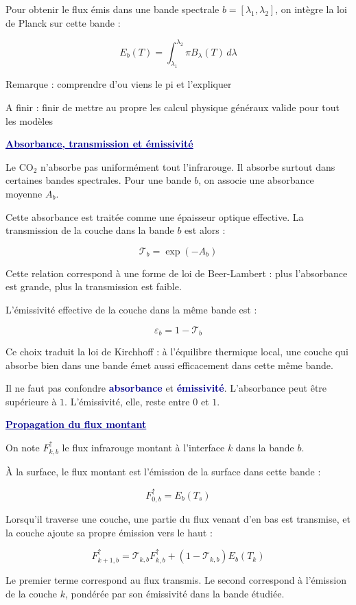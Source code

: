 \documentclass[11pt,a4paper]{article}
\newcommand{\COtwo}{CO$_2$}
\newcommand{\motcle}[1]{\textcolor{DarkBlue}{\textbf{#1}}}
\newcommand{\bloc}[1]{\vspace{0.9em}\noindent\textcolor{DarkBlue}{\underline{\textbf{#1}}}\par\vspace{0.35em}}
\begin{document}
Pour obtenir le flux émis dans une bande spectrale $b=[\lambda_1,\lambda_2]$, on intègre la loi de Planck sur cette bande :

\[
E_b(T)
=
\int_{\lambda_1}^{\lambda_2}
\pi B_\lambda(T)\,d\lambda
\]

\textcolor{green!50!black}{Remarque : comprendre d'ou viens le pi et l'expliquer}

\textcolor{green!50!black}{A finir : finir de mettre au propre les calcul physique généraux valide pour tout les modèles}

\bloc{Absorbance, transmission et émissivité}


Le \COtwo{} n'absorbe pas uniformément tout l'infrarouge. Il absorbe surtout dans certaines bandes spectrales. Pour une bande $b$, on associe une absorbance moyenne $A_b$.

Cette absorbance est traitée comme une épaisseur optique effective. La transmission de la couche dans la bande $b$ est alors :

\[
\mathcal{T}_b = \exp(-A_b)
\]

Cette relation correspond à une forme de loi de Beer-Lambert : plus l'absorbance est grande, plus la transmission est faible.

L'émissivité effective de la couche dans la même bande est :

\[
\varepsilon_b = 1-\mathcal{T}_b
\]

Ce choix traduit la loi de Kirchhoff : à l'équilibre thermique local, une couche qui absorbe bien dans une bande émet aussi efficacement dans cette même bande.

Il ne faut pas confondre \motcle{absorbance} et \motcle{émissivité}. L'absorbance peut être supérieure à $1$. L'émissivité, elle, reste entre $0$ et $1$.

\bloc{Propagation du flux montant}

On note $F^\uparrow_{k,b}$ le flux infrarouge montant à l'interface $k$ dans la bande $b$.

À la surface, le flux montant est l'émission de la surface dans cette bande :

\[
F^\uparrow_{0,b} = E_b(T_s)
\]

Lorsqu'il traverse une couche, une partie du flux venant d'en bas est transmise, et la couche ajoute sa propre émission vers le haut :

\[
F^\uparrow_{k+1,b}
=
\mathcal{T}_{k,b} F^\uparrow_{k,b}
+
\left(1-\mathcal{T}_{k,b}\right)E_b(T_k)
\]

Le premier terme correspond au flux transmis. Le second correspond à l'émission de la couche $k$, pondérée par son émissivité dans la bande étudiée.
\end{document}
